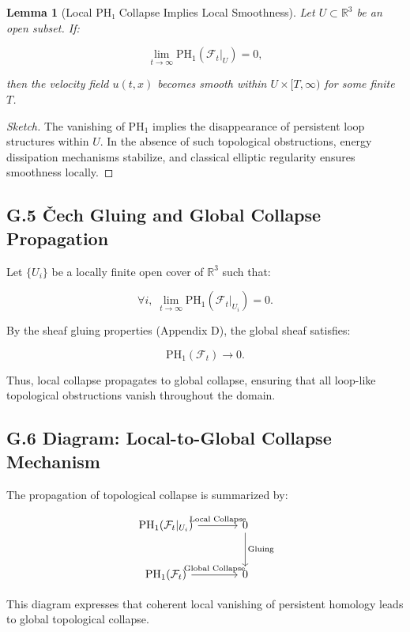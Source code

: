 \documentclass[11pt]{article}
\newtheorem{lemma}[theorem]{Lemma}
\begin{document}
\begin{lemma}[Local PH₁ Collapse Implies Local Smoothness]
Let \( U \subset \mathbb{R}^3 \) be an open subset.  
If:

\[
\lim_{t \to \infty} \mathrm{PH}_1(\mathcal{F}_t|_U) = 0,
\]

then the velocity field \( u(t, x) \) becomes smooth within \( U \times [T, \infty) \) for some finite \( T \).
\end{lemma}

\begin{proof}[Sketch]
The vanishing of \( \mathrm{PH}_1 \) implies the disappearance of persistent loop structures within \( U \).  
In the absence of such topological obstructions, energy dissipation mechanisms stabilize, and classical elliptic regularity ensures smoothness locally.
\end{proof}

\subsection*{G.5 Čech Gluing and Global Collapse Propagation}

Let \( \{ U_i \} \) be a locally finite open cover of \( \mathbb{R}^3 \) such that:

\[
\forall i,\; \lim_{t \to \infty} \mathrm{PH}_1(\mathcal{F}_t|_{U_i}) = 0.
\]

By the sheaf gluing properties (Appendix D), the global sheaf satisfies:

\[
\mathrm{PH}_1(\mathcal{F}_t) \to 0.
\]

Thus, local collapse propagates to global collapse, ensuring that all loop-like topological obstructions vanish throughout the domain.

\subsection*{G.6 Diagram: Local-to-Global Collapse Mechanism}

The propagation of topological collapse is summarized by:

\[
\begin{tikzcd}[row sep=large, column sep=large]
\mathrm{PH}_1(\mathcal{F}_t|_{U_i})
  \arrow[r, "\text{Local Collapse}"]
& 0
  \arrow[d, "\text{Gluing}"] \\
\mathrm{PH}_1(\mathcal{F}_t)
  \arrow[r, "\text{Global Collapse}"]
& 0
\end{tikzcd}
\]

This diagram expresses that coherent local vanishing of persistent homology leads to global topological collapse.
\end{document}

